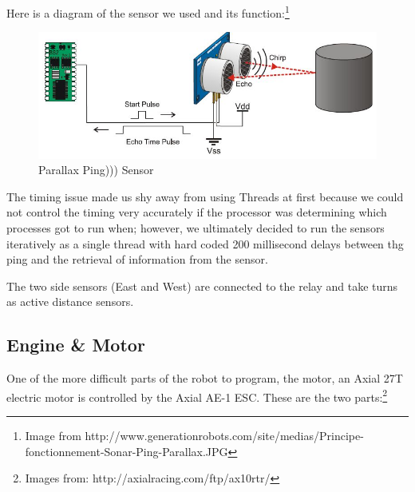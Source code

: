 \documentclass[12pt]{article}
\begin{document}
Here is a diagram of the sensor we used and its function:\footnote{Image from http://www.generationrobots.com/site/medias/Principe-fonctionnement-Sonar-Ping-Parallax.JPG}

\begin{figure}[h]
\centerline{\includegraphics[scale=.8]{img/sonar}}
\caption{Parallax Ping))) Sensor}
\end{figure}

The timing issue made us shy away from using Threads at first because we could not control the timing very accurately if the processor was determining which processes got to run when; however, we ultimately decided to run the sensors iteratively as a single thread with hard coded 200 millisecond delays between thg ping and the retrieval of information from the sensor.

The two side sensors (East and West) are connected to the relay and take turns as active distance sensors.

\clearpage
\subsection{Engine \& Motor}
One of the more difficult parts of the robot to program, the motor, an Axial 27T electric motor is controlled by the Axial AE-1 ESC.  These are the two parts:\footnote{Images from: http://axialracing.com/ftp/ax10rtr/}

\begin{figure}[h]
\centering
{}
\hspace{5mm}
\end{figure}
\end{document}
